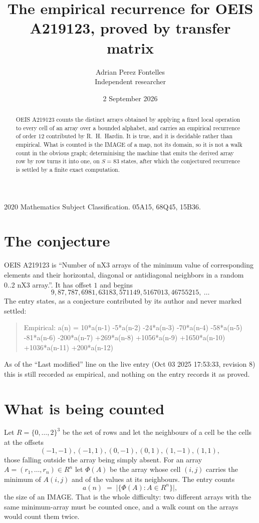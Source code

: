 \documentclass[11pt,a4paper]{article}
\title{The empirical recurrence for OEIS A219123, proved by transfer matrix}
\author{Adrian Perez Fontelles\\ \small Independent researcher}
\date{2 September 2026}
\theoremstyle{plain}
\theoremstyle{definition}
\begin{document}
\maketitle

\begin{abstract}
OEIS A219123 counts the distinct arrays obtained by applying a fixed local operation to every cell
of an array over a bounded alphabet, and carries an empirical recurrence of order $12$
contributed by R.~H.~Hardin. It is true, and it is decidable rather than empirical. What is
counted is the IMAGE of a map, not its domain, so it is not a walk count in the obvious graph;
determinising the machine that emits the derived array row by row turns it into one, on
$S=83$ states, after which the conjectured recurrence is settled by a finite exact
computation.
\end{abstract}

\noindent\small 2020 Mathematics Subject Classification. 05A15, 68Q45, 15B36.\normalsize

\section{The conjecture}

OEIS A219123 is ``Number of nX3 arrays of the minimum value of corresponding elements and their horizontal, diagonal or antidiagonal neighbors in a random 0..2 nX3 array.''. It has offset $1$ and begins
\[
9, 87, 787, 6981, 63183, 571149, 5167013, 46755215,\ \dots
\]
The entry states, as a conjecture contributed by its author and never marked settled:
\begin{quote}
Empirical: a(n) = 10*a(n-1) -5*a(n-2) -24*a(n-3) -70*a(n-4) -58*a(n-5) -81*a(n-6) -200*a(n-7) +269*a(n-8) +1056*a(n-9) +1650*a(n-10) +1036*a(n-11) +200*a(n-12)
\end{quote}
As of the ``Last modified'' line on the live entry (Oct 03 2025 17:53:33, revision 8) this is still
recorded as empirical, and nothing on the entry records it as proved.

\section{What is being counted}

Let $R=\{0,\dots,2\}^{3}$ be the set of rows and let the neighbours of
a cell be the cells at the offsets
\[
(-1,-1), (-1,1), (0,-1), (0,1), (1,-1), (1,1),
\]
those falling outside the array being simply absent. For an array
$A=(r_1,\dots,r_n)\in R^n$ let $\Phi(A)$ be the array whose cell $(i,j)$ carries the
minimum of $A(i,j)$ and of the values at its neighbours. The entry counts
\[
a(n)\;=\;\bigl|\{\Phi(A):A\in R^n\}\bigr| ,
\]
the size of an IMAGE. That is the whole difficulty: two different arrays with the same
minimum-array must be counted once, and a walk count on the arrays would count them twice.
\end{document}

